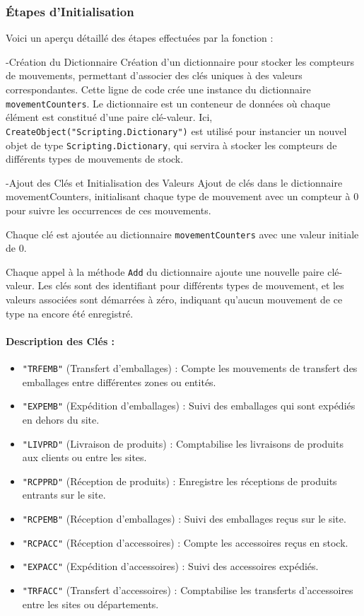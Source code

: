 \documentclass[a4paper, oneside, 12pt, final]{extreport}
\begin{document}
\subsubsection{Étapes d'Initialisation}
Voici un aperçu détaillé des étapes effectuées par la fonction :

-Création du Dictionnaire
Création d'un dictionnaire pour stocker les compteurs de mouvements, permettant d'associer des clés uniques à des valeurs correspondantes.
Cette ligne de code crée une instance du dictionnaire \texttt{movementCounters}. Le dictionnaire est un conteneur de données où chaque élément est constitué d'une paire clé-valeur. Ici, \texttt{CreateObject("Scripting.Dictionary")} est utilisé pour instancier un nouvel objet de type \texttt{Scripting.Dictionary}, qui servira à stocker les compteurs de différents types de mouvements de stock.

-Ajout des Clés et Initialisation des Valeurs
Ajout de clés dans le dictionnaire movementCounters, initialisant chaque type de mouvement avec un compteur à 0 pour suivre les occurrences de ces mouvements.

Chaque clé est ajoutée au dictionnaire \texttt{movementCounters} avec une valeur initiale de 0.

Chaque appel à la méthode \texttt{Add} du dictionnaire ajoute une nouvelle paire clé-valeur. Les clés sont des identifiant pour différents types de mouvement, et les valeurs associées sont démarrées à zéro, indiquant qu'aucun mouvement de ce type na encore été enregistré.

\paragraph{Description des Clés :}
\begin{itemize}
    \item \texttt{"TRFEMB"} (Transfert d'emballages) : Compte les mouvements de transfert des emballages entre différentes zones ou entités.
    \item \texttt{"EXPEMB"} (Expédition d'emballages) : Suivi des emballages qui sont expédiés en dehors du site.
    \item \texttt{"LIVPRD"} (Livraison de produits) : Comptabilise les livraisons de produits aux clients ou entre les sites.
    \item \texttt{"RCPPRD"} (Réception de produits) : Enregistre les réceptions de produits entrants sur le site.
    \item \texttt{"RCPEMB"} (Réception d'emballages) : Suivi des emballages reçus sur le site.
    \item \texttt{"RCPACC"} (Réception d'accessoires) : Compte les accessoires reçus en stock.
    \item \texttt{"EXPACC"} (Expédition d'accessoires) : Suivi des accessoires expédiés.
    \item \texttt{"TRFACC"} (Transfert d'accessoires) : Comptabilise les transferts d'accessoires entre les sites ou départements.
\end{itemize}
\end{document}
